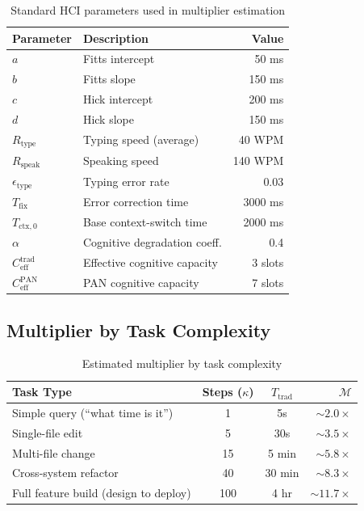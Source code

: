 \documentclass[11pt, a4paper]{article}
\begin{document}
\begin{table}[h]
\centering
\begin{tabular}{@{}llr@{}}
\toprule
\textbf{Parameter} & \textbf{Description} & \textbf{Value} \\
\midrule
$a$ & Fitts intercept & 50 ms \\
$b$ & Fitts slope & 150 ms \\
$c$ & Hick intercept & 200 ms \\
$d$ & Hick slope & 150 ms \\
$R_{\text{type}}$ & Typing speed (average) & 40 WPM \\
$R_{\text{speak}}$ & Speaking speed & 140 WPM \\
$\epsilon_{\text{type}}$ & Typing error rate & 0.03 \\
$T_{\text{fix}}$ & Error correction time & 3000 ms \\
$T_{\text{ctx},0}$ & Base context-switch time & 2000 ms \\
$\alpha$ & Cognitive degradation coeff. & 0.4 \\
$C_{\text{eff}}^{\text{trad}}$ & Effective cognitive capacity & 3 slots \\
$C_{\text{eff}}^{\text{PAN}}$ & PAN cognitive capacity & 7 slots \\
\bottomrule
\end{tabular}
\caption{Standard HCI parameters used in multiplier estimation}
\label{tab:params}
\end{table}

\subsection{Multiplier by Task Complexity}

\begin{table}[h]
\centering
\begin{tabular}{@{}lccr@{}}
\toprule
\textbf{Task Type} & \textbf{Steps ($\kappa$)} & \textbf{$T_{\text{trad}}$} & \textbf{$\mathcal{M}$} \\
\midrule
Simple query (``what time is it'')       & 1   & 5s     & $\sim\!2.0\times$ \\
Single-file edit                         & 5   & 30s    & $\sim\!3.5\times$ \\
Multi-file change                        & 15  & 5 min  & $\sim\!5.8\times$ \\
Cross-system refactor                    & 40  & 30 min & $\sim\!8.3\times$ \\
Full feature build (design to deploy)    & 100 & 4 hr   & $\sim\!11.7\times$ \\
\bottomrule
\end{tabular}
\caption{Estimated multiplier by task complexity}
\label{tab:multipliers}
\end{table}
\end{document}
